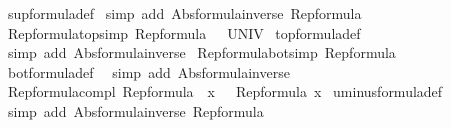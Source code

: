 \begin{isabellebody}
%
\isadelimproof
%
\endisadelimproof
%
\isatagproof
{}\isamarkupfalse%
\ sup{\isacharunderscore}formula{\isacharunderscore}def\isanewline
{}\isamarkupfalse%
\ {\isacharparenleft}simp\ add{\isacharcolon}\ Abs{\isacharunderscore}formula{\isacharunderscore}inverse\ Rep{\isacharunderscore}formula{\isacharparenright}%
\endisatagproof
{\isafoldproof}%
%
\isadelimproof
\isanewline
%
\endisadelimproof
\isanewline
{}\isamarkupfalse%
\ Rep{\isacharunderscore}formula{\isacharunderscore}top{\isacharbrackleft}simp{\isacharbrackright}{\isacharcolon}\ {\isachardoublequoteopen}Rep{\isacharunderscore}formula\ {\isasymtop}\ {\isacharequal}\ UNIV{\isachardoublequoteclose}\isanewline
%
\isadelimproof
%
\endisadelimproof
%
\isatagproof
{}\isamarkupfalse%
\ top{\isacharunderscore}formula{\isacharunderscore}def\isanewline
{}\isamarkupfalse%
\ {\isacharparenleft}simp\ add{\isacharcolon}\ Abs{\isacharunderscore}formula{\isacharunderscore}inverse{\isacharparenright}%
\endisatagproof
{\isafoldproof}%
%
\isadelimproof
\isanewline
%
\endisadelimproof
\isanewline
{}\isamarkupfalse%
\ Rep{\isacharunderscore}formula{\isacharunderscore}bot{\isacharbrackleft}simp{\isacharbrackright}{\isacharcolon}\ {\isachardoublequoteopen}Rep{\isacharunderscore}formula\ {\isasymbottom}\ {\isacharequal}\ {\isacharbraceleft}{\isacharbraceright}{\isachardoublequoteclose}\isanewline
%
\isadelimproof
%
\endisadelimproof
%
\isatagproof
{}\isamarkupfalse%
\ bot{\isacharunderscore}formula{\isacharunderscore}def\ \isanewline
{}\isamarkupfalse%
\ {\isacharparenleft}simp\ add{\isacharcolon}\ Abs{\isacharunderscore}formula{\isacharunderscore}inverse{\isacharparenright}%
\endisatagproof
{\isafoldproof}%
%
\isadelimproof
\isanewline
%
\endisadelimproof
\isanewline
{}\isamarkupfalse%
\ Rep{\isacharunderscore}formula{\isacharunderscore}compl{\isacharcolon}\ {\isachardoublequoteopen}Rep{\isacharunderscore}formula\ {\isacharparenleft}{\isacharminus}\ x{\isacharparenright}\ {\isacharequal}\ {\isacharminus}\ Rep{\isacharunderscore}formula\ x{\isachardoublequoteclose}\isanewline
%
\isadelimproof
%
\endisadelimproof
%
\isatagproof
{}\isamarkupfalse%
\ uminus{\isacharunderscore}formula{\isacharunderscore}def\isanewline
{}\isamarkupfalse%
\ {\isacharparenleft}simp\ add{\isacharcolon}\ Abs{\isacharunderscore}formula{\isacharunderscore}inverse\ Rep{\isacharunderscore}formula{\isacharparenright}%
\endisatagproof
{\isafoldproof}%
%
\isadelimproof
\isanewline

\end{isabellebody}
